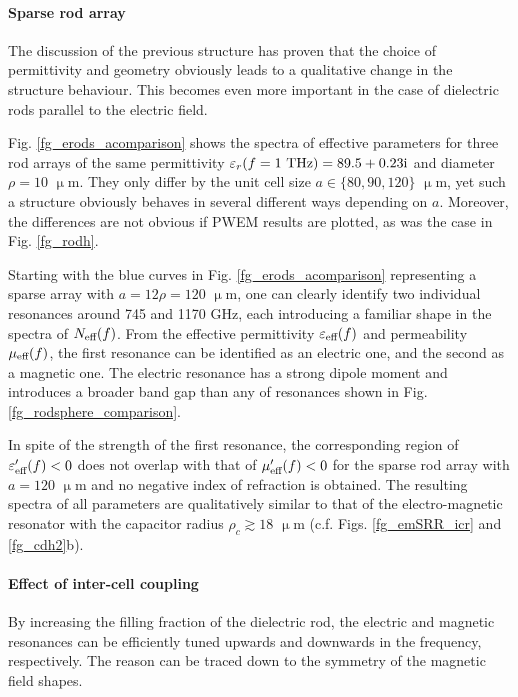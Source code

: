 \paragraph{Sparse rod array} %
The discussion of the previous structure has proven that the choice of permittivity and geometry obviously leads to a qualitative change in the structure behaviour. This becomes even more important in the case of dielectric rods parallel to the electric field. 

Fig. \ref{fg_erods_acomparison} shows the spectra of effective parameters for three rod arrays of the same permittivity $\varepsilon_r(f=1\text{ THz}) = 89.5+0.23{\mathrm i}$ and diameter $\rho=10$ $\upmu$m. They only differ by the unit cell size $a \in \{80, 90, 120\}$ $\upmu$m, yet such a structure obviously behaves in several different ways depending on $a$. Moreover, the differences are not obvious if PWEM results are plotted, as was the case in Fig. \ref{fg_rodh}.  

Starting with the blue curves in Fig. \ref{fg_erods_acomparison} representing a sparse array with $a=12\rho = 120$ $\upmu$m, one can clearly identify two individual resonances around 745 and 1170 GHz, each introducing a familiar shape in the spectra of $N_{\text{eff} }(f)$. From the effective permittivity $\varepsilon_{\text{eff} }(f)$ and permeability $\mu_{\text{eff} }(f)$, the first resonance can be identified as an electric one, and the second as a magnetic one. The electric resonance has a strong dipole moment and introduces a broader band gap than any of resonances shown in Fig. \ref{fg_rodsphere_comparison}. %

In spite of the strength of the first resonance, the corresponding region of $\varepsilon_{\text{eff} }'(f)<0$ does not overlap with that of $\mu_{\text{eff} }'(f)<0$ for the sparse rod array with $a=120$ $\upmu$m and no negative index of refraction is obtained. The resulting spectra of all parameters are qualitatively similar to that of the electro-magnetic resonator with the capacitor radius $\rho_c\gtrsim 18$ $\upmu$m  (c.f. Figs. \ref{fg_emSRR_icr} and \ref{fg_cdh2}b).

\paragraph{Effect of inter-cell coupling}%
By increasing the filling fraction of the dielectric rod, the electric and magnetic resonances can be efficiently tuned upwards and downwards in the frequency, respectively. 
The reason can be traced down to the symmetry of the magnetic field shapes. 

